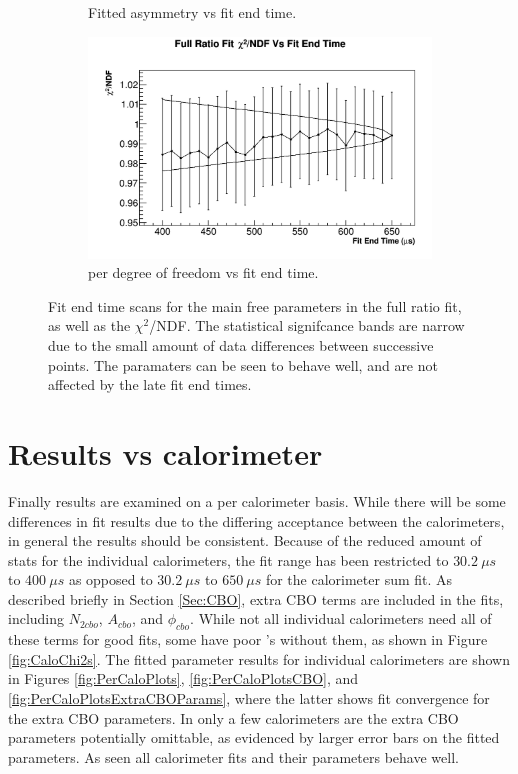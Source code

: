\begin{figure}[]
\begin{subfigure}[t]{0.45\textwidth}
		    \caption{Fitted asymmetry vs fit end time.}
	    \end{subfigure}
	    \begin{subfigure}[t]{0.45\textwidth}
		    \centering
			\includegraphics[width=\textwidth]{RatioCBO_Chi2NDF_Vs_FE_canv}
		    \caption{\chisq per degree of freedom vs fit end time.}
	    \end{subfigure}%
	\caption[FitEndScans]{Fit end time scans for the main free parameters in the full ratio fit, as well as the $\chi^{2}$/NDF. The statistical signifcance bands are narrow due to the small amount of data differences between successive points. The paramaters can be seen to behave well, and are not affected by the late fit end times.}
	\label{fig:FitEndScans}
	\end{figure}


\clearpage

\section{Results vs calorimeter}

	Finally results are examined on a per calorimeter basis. While there will be some differences in fit results due to the differing acceptance between the calorimeters, in general the results should be consistent. Because of the reduced amount of stats for the individual calorimeters, the fit range has been restricted to $\SI{30.2}{\mu s}$ to $\SI{400}{\mu s}$ as opposed to $\SI{30.2}{\mu s}$ to $\SI{650}{\mu s}$ for the calorimeter sum fit. As described briefly in Section \ref{Sec:CBO}, extra CBO terms are included in the fits, including $N_{2cbo}$, $A_{cbo}$, and $\phi_{cbo}$. While not all individual calorimeters need all of these terms for good fits, some have poor \chisq's without them, as shown in Figure \ref{fig:CaloChi2s}. The fitted parameter results for individual calorimeters are shown in Figures \ref{fig:PerCaloPlots}, \ref{fig:PerCaloPlotsCBO}, and \ref{fig:PerCaloPlotsExtraCBOParams}, where the latter shows fit convergence for the extra CBO parameters. In only a few calorimeters are the extra CBO parameters potentially omittable, as evidenced by larger error bars on the fitted parameters. As seen all calorimeter fits and their parameters behave well.

